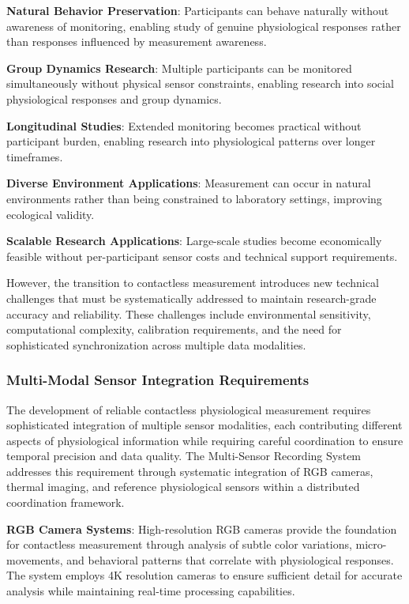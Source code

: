 \documentclass[12pt,a4paper]{report}
\begin{document}
\textbf{Natural Behavior Preservation}: Participants can behave naturally without awareness of monitoring, enabling study of
genuine physiological responses rather than responses influenced by measurement awareness.

\textbf{Group Dynamics Research}: Multiple participants can be monitored simultaneously without physical sensor constraints,
enabling research into social physiological responses and group dynamics.

\textbf{Longitudinal Studies}: Extended monitoring becomes practical without participant burden, enabling research into
physiological patterns over longer timeframes.

\textbf{Diverse Environment Applications}: Measurement can occur in natural environments rather than being constrained to
laboratory settings, improving ecological validity.

\textbf{Scalable Research Applications}: Large-scale studies become economically feasible without per-participant sensor
costs and technical support requirements.

However, the transition to contactless measurement introduces new technical challenges that must be systematically
addressed to maintain research-grade accuracy and reliability. These challenges include environmental sensitivity,
computational complexity, calibration requirements, and the need for sophisticated synchronization across multiple data
modalities.

\subsubsection{Multi-Modal Sensor Integration Requirements}

The development of reliable contactless physiological measurement requires sophisticated integration of multiple sensor
modalities, each contributing different aspects of physiological information while requiring careful coordination to
ensure temporal precision and data quality. The Multi-Sensor Recording System addresses this requirement through
systematic integration of RGB cameras, thermal imaging, and reference physiological sensors within a distributed
coordination framework.

\textbf{RGB Camera Systems}: High-resolution RGB cameras provide the foundation for contactless measurement through analysis
of subtle color variations, micro-movements, and behavioral patterns that correlate with physiological responses. The
system employs 4K resolution cameras to ensure sufficient detail for accurate analysis while maintaining real-time
processing capabilities.
\end{document}
